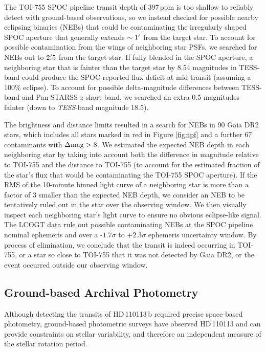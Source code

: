 \documentclass[fleqn,usenatbib]{mnras}
\newcommand{\Tstar}{HD\,110113}
\newcommand{\Tplanet}{HD\,110113\,b}
\begin{document}
The TOI-755 SPOC pipeline transit depth of 397\,ppm is too shallow to reliably detect with ground-based observations, so we instead checked for possible nearby eclipsing binaries (NEBs) that could be contaminating the irregularly shaped SPOC aperture that generally extends $\sim1\hbox{$^\prime$}$ from the target star.
To account for possible contamination from the wings of neighboring star PSFs, we searched for NEBs out to $2\hbox{$.\mkern-4mu^\prime$}5$ from the target star.
If fully blended in the SPOC aperture, a neighboring star that is fainter than the target star by 8.54 magnitudes in TESS-band could produce the SPOC-reported flux deficit at mid-transit (assuming a 100\% eclipse).
To account for possible delta-magnitude differences between TESS-band and Pan-STARSS $z$-short band, we searched an extra 0.5 magnitudes fainter (down to \textit{TESS}-band magnitude 18.5). 

The brightness and distance limits resulted in a search for NEBs in 90 Gaia DR2 stars, which includes all stars marked in red in Figure \ref{fig:tpf} and a further 67 contaminants with $\Delta{\rm mag}>8$.
We estimated the expected NEB depth in each neighboring star by taking into account both the difference in magnitude relative to TOI-755 and the distance to TOI-755 (to account for the estimated fraction of the star's flux that would be contaminating the TOI-755 SPOC aperture).
If the RMS of the 10-minute binned light curve of a neighboring star is more than a factor of 3 smaller than the expected NEB depth, we consider an NEB to be tentatively ruled out in the star over the observing window.
We then visually inspect each neighboring star's light curve to ensure no obvious eclipse-like signal.
The LCOGT data rule out possible contaminating NEBs at the SPOC pipeline nominal ephemeris and over a -$1.7\sigma$ to +$2.3\sigma$ ephemeris uncertainty window.
By process of elimination, we conclude that the transit is indeed occurring in TOI-755, or a star so close to TOI-755 that it was not detected by Gaia DR2, or the event occurred outside our observing window.

\subsection{Ground-based Archival Photometry}
Although detecting the transits of \Tplanet{} required precise space-based photometry, ground-based photometric surveys have observed \Tstar{} and can provide constraints on stellar variability, and therefore an independent measure of the stellar rotation period.
\end{document}
